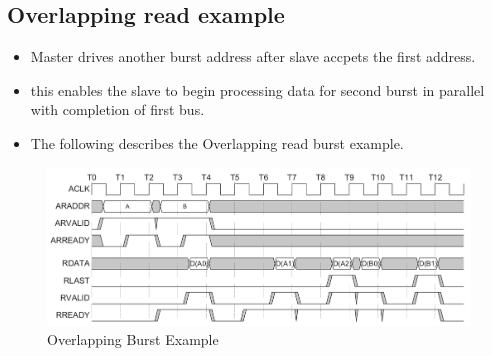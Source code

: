 \documentclass{article}
\begin{document}
\subsection{Overlapping read example}
\begin{itemize}
    \item Master drives another burst address after slave accpets the first address.
    \item this enables the slave to begin processing data for second burst in parallel with completion of first bus.
    \item The following describes the Overlapping read burst example.
\end{itemize}
\begin{figure}[H]
    \centering
    \includegraphics[width=1\textwidth]{./Resources/overlappingBurstExample.png}
    \caption{Overlapping Burst Example}
\end{figure}
\end{document}
